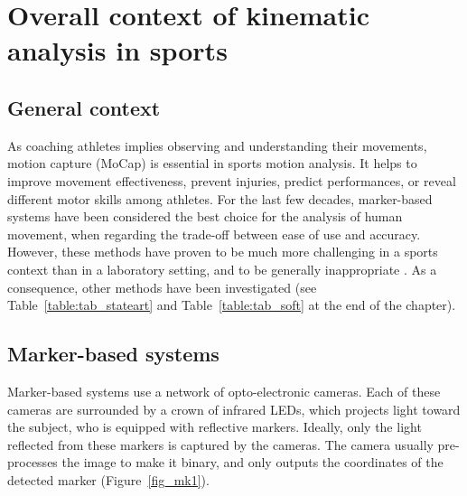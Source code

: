 \minitoc
\newpage



\FloatBarrier
\section{Overall context of kinematic analysis in sports}
\subsection{General context}

As coaching athletes implies observing and understanding their movements, motion capture (MoCap) is essential in sports motion analysis. It helps to improve movement effectiveness, prevent injuries, predict performances, or reveal different motor skills among athletes. For the last few decades, marker-based systems have been considered the best choice for the analysis of human movement, when regarding the trade-off between ease of use and accuracy. However, these methods have proven to be much more challenging in a sports context than in a laboratory setting, and to be generally inappropriate \cite{Mündermann2006, Colyer2018}. As a consequence, other methods have been investigated (see Table~\ref{table:tab_stateart} and Table~\ref{table:tab_soft} at the end of the chapter).

\subsection{Marker-based systems}

Marker-based systems use a network of opto-electronic cameras. Each of these cameras are surrounded by a crown of infrared LEDs, which projects light toward the subject, who is equipped with reflective markers. Ideally, only the light reflected from these markers is captured by the cameras. The camera usually pre-processes the image to make it binary, and only outputs the coordinates of the detected marker (Figure~\ref{fig_mk1}). 

